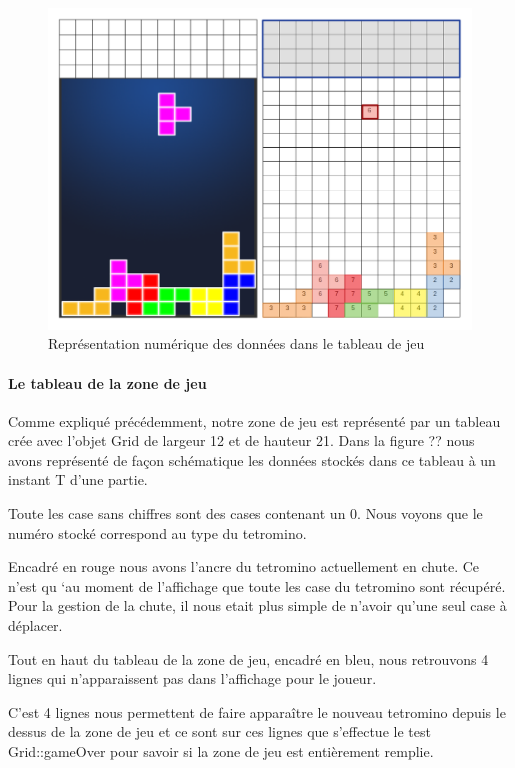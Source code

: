 \documentclass[a4paper, 12pt]{article}
\begin{document}
			\begin{figure}[bt]
				\centering
				\includegraphics[scale=0.35]{img/grid.png}
				\caption{Représentation numérique des données dans le tableau de jeu}
				\label{fig:grid}
			\end{figure}

			\paragraph{Le tableau de la zone de jeu}

			Comme expliqué précédemment, notre zone de jeu est représenté par un tableau crée avec l’objet Grid de largeur 12 et de hauteur 21. Dans la figure ?? nous avons représenté de façon schématique les données stockés dans ce tableau à un instant T d’une partie.

			Toute les case sans chiffres sont des cases contenant un 0. Nous voyons que le numéro stocké correspond au type du tetromino.

			Encadré en rouge nous avons l’ancre du tetromino actuellement en chute. Ce n’est qu ‘au moment de l’affichage que toute les case du tetromino sont récupéré. Pour la gestion de la chute, il nous etait plus simple de n’avoir qu’une seul case à déplacer. 

			Tout en haut du tableau de la zone de jeu, encadré en bleu, nous retrouvons 4 lignes qui n’apparaissent pas dans l’affichage pour le joueur.

			C’est 4 lignes nous permettent de faire apparaître le nouveau tetromino depuis le dessus de la zone de jeu et ce sont sur ces lignes que s’effectue le test Grid::gameOver pour savoir si la zone de jeu est entièrement remplie.
\end{document}
